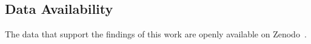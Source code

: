 \subsection*{Data Availability}
The data that support the findings of this work are openly available on Zenodo~\cite{pinetti_2025_17704724}.

\medskip

